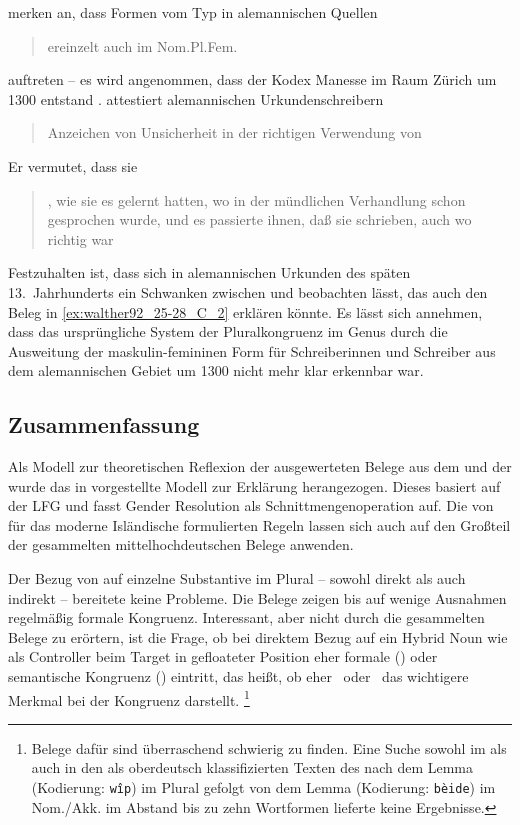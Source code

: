 \citeauthor{ksw2} merken an, dass Formen vom Typ  in alemannischen
Quellen \blockcquote[485]{ksw2}{ereinzelt auch im Nom.Pl.Fem.}
auftreten -- es wird angenommen, dass der Kodex Manesse im Raum Zürich um 1300
entstand \autocite[4957]{hsc}.  attestiert alemannischen
Urkundenschreibern \blockcquote[27]{deboor1976b}{Anzeichen von Unsicherheit in
der richtigen Verwendung von }. Er vermutet, dass sie
\blockcquote[28]{deboor1976b}{ , wie sie es
gelernt hatten, wo in der mündlichen Verhandlung schon  gesprochen
wurde, und es passierte ihnen, daß sie  schrieben, auch wo
 richtig war}. Festzuhalten ist, dass sich in alemannischen Urkunden
des späten 13.~Jahrhunderts ein Schwanken zwischen  und 
beobachten lässt, das auch den Beleg in \cref{ex:walther92_25-28_C_2} erklären
könnte. Es lässt sich annehmen, dass das ursprüngliche System der
Pluralkongruenz im Genus durch die Ausweitung der maskulin-femininen Form für
Schreiberinnen und Schreiber aus dem alemannischen Gebiet um 1300 nicht mehr
klar erkennbar war.

\subsection{Zusammenfassung}

Als Modell zur theoretischen Reflexion der ausgewerteten Belege aus dem
\CAO{} und der \KC{} wurde das in
\citet{wechsler2009,wechslerzlatic2003} vorgestellte Modell zur Erklärung
herangezogen. Dieses basiert auf der LFG und fasst Gender Resolution als
Schnittmengenoperation auf. Die von
\textcites[578]{wechsler2009}[186]{wechslerzlatic2003} für das moderne
Isländische formulierten Regeln lassen sich auch auf den Großteil der
gesammelten mittelhochdeutschen Belege anwenden.

Der Bezug von  auf einzelne Substantive im Plural -- sowohl direkt
als auch indirekt -- bereitete keine Probleme. Die Belege zeigen bis auf wenige
Ausnahmen regelmäßig formale Kongruenz. Interessant, aber nicht durch die
gesammelten Belege zu erörtern, ist die Frage, ob bei direktem Bezug auf ein
Hybrid Noun wie   als Controller beim Target in
gefloateter Position eher formale () oder semantische Kongruenz
() eintritt, das heißt, ob eher \Gend\ oder \Sex\ das wichtigere
Merkmal bei der Kongruenz darstellt.%
%
	\footnote{Belege dafür sind überraschend schwierig zu finden. Eine Suche
	sowohl im \CAO{} als auch in den als oberdeutsch klassifizierten
	Texten des \REM{} nach dem Lemma  (Kodierung: \texttt{wîp})
	im Plural gefolgt von dem Lemma  (Kodierung: \texttt{bèide}) im
	Nom./Akk. im Abstand bis zu zehn Wortformen lieferte keine Ergebnisse.}

